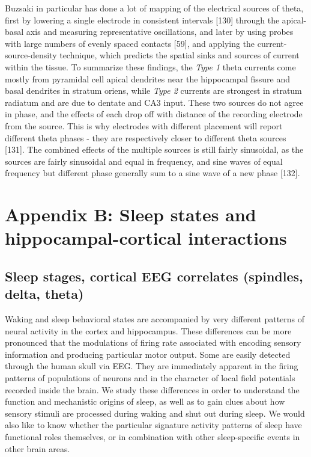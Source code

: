 \documentclass[]{article}
\let\stdsection\section
\renewcommand\section{\newpage\stdsection}
\begin{document}
Buzsaki in particular has done a lot of mapping of the electrical
sources of theta, first by lowering a single electrode in consistent
intervals {[}130{]} through the apical-basal axis and measuring
representative oscillations, and later by using probes with large
numbers of evenly spaced contacts {[}59{]}, and applying the
current-source-density technique, which predicts the spatial sinks and
sources of current within the tissue. To summarize these findings, the
\emph{Type 1} theta currents come mostly from pyramidal cell apical
dendrites near the hippocampal fissure and basal dendrites in stratum
oriens, while \emph{Type 2} currents are strongest in stratum radiatum
and are due to dentate and CA3 input. These two sources do not agree in
phase, and the effects of each drop off with distance of the recording
electrode from the source. This is why electrodes with different
placement will report different theta phases - they are respectively
closer to different theta sources {[}131{]}. The combined effects of the
multiple sources is still fairly sinusoidal, as the sources are fairly
sinusoidal and equal in frequency, and sine waves of equal frequency but
different phase generally sum to a sine wave of a new phase {[}132{]}.

\section{Appendix B: Sleep states and hippocampal-cortical interactions}

\subsection{Sleep stages, cortical EEG correlates (spindles, delta,
theta)}

Waking and sleep behavioral states are accompanied by very different
patterns of neural activity in the cortex and hippocampus. These
differences can be more pronounced that the modulations of firing rate
associated with encoding sensory information and producing particular
motor output. Some are easily detected through the human skull via EEG.
They are immediately apparent in the firing patterns of populations of
neurons and in the character of local field potentials recorded inside
the brain. We study these differences in order to understand the
function and mechanistic origins of sleep, as well as to gain clues
about how sensory stimuli are processed during waking and shut out
during sleep. We would also like to know whether the particular
signature activity patterns of sleep have functional roles themselves,
or in combination with other sleep-specific events in other brain areas.
\end{document}
